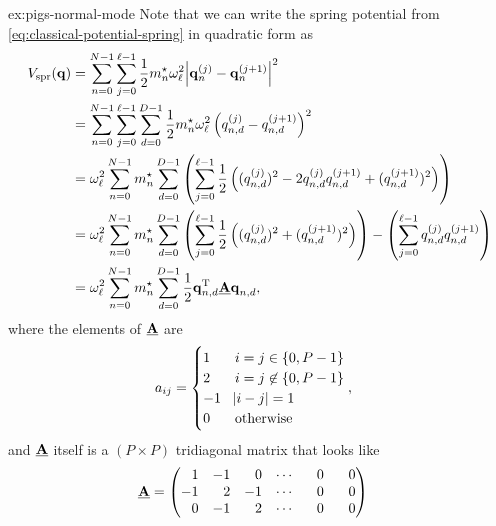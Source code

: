 \begin{DefAnswer}{ex:pigs-normal-mode}
	Note that we can write the spring potential from \cref{eq:classical-potential-spring} in quadratic form as
	\begin{subequations}
	\begin{align}
		V_\mathrm{spr}(\bm{\mathbf{q}})
		&= \sum_{n=0}^{N-1} \sum_{j=0}^{\ell - 1}
			\frac{1}{2} {m}^\star_n \omega_\ell^2 \abs{\bm{\mathbf{q}}_n^{(j)} - \bm{\mathbf{q}}_n^{(j+1)}}^2 \\
		&= \sum_{n=0}^{N-1} \sum_{j=0}^{\ell - 1} \sum_{d=0}^{D-1}
			\frac{1}{2} {m}^\star_n \omega_\ell^2 \left( q_{n,d}^{(j)} - q_{n,d}^{(j+1)} \right)^2 \\
		&= \omega_\ell^2 \sum_{n=0}^{N-1} {m}^\star_n \sum_{d=0}^{D-1} \left(
				\sum_{j=0}^{\ell - 1}
					\frac{1}{2} \left( (q_{n,d}^{(j)})^2 - 2 q_{n,d}^{(j)} q_{n,d}^{(j+1)} + (q_{n,d}^{(j+1)})^2 \right)
			\right) \\
		&= \omega_\ell^2 \sum_{n=0}^{N-1} {m}^\star_n \sum_{d=0}^{D-1} \left(
				\sum_{j=0}^{\ell - 1} \frac{1}{2} \left( (q_{n,d}^{(j)})^2 + (q_{n,d}^{(j+1)})^2 \right)
			\right) - \left(
				\sum_{j=0}^{\ell - 1} q_{n,d}^{(j)} q_{n,d}^{(j+1)}
			\right) \\
		&= \omega_\ell^2 \sum_{n=0}^{N-1} {m}^\star_n \sum_{d=0}^{D-1} \frac{1}{2} \bm{\mathbf{q}}_{n,d}^\mathrm{T} \underline{\bm{\mathbf{A}}} \bm{\mathbf{q}}_{n,d},
			\label{eq:pigs-spring-cartesian}
	\end{align}
	\end{subequations}
	where the elements of $\underline{\bm{\mathbf{A}}}$ are
	\begin{align}
		a_{ij}
		&= \begin{cases}
				1 & i = j \in \{ 0, P-1 \} \\
				2 & i = j \not\in \{ 0, P-1 \} \\
				-1 & \abs{i - j} = 1 \\
				0 & \text{otherwise}
			\end{cases},
				\label{eq:nm-matrix}
	\end{align}
	and $\underline{\bm{\mathbf{A}}}$ itself is a $(P \times P)$ tridiagonal matrix that looks like
	\begin{align}
		\underline{\bm{\mathbf{A}}}
		&= \begin{pmatrix}
				\phantom{-}1 & -1 & \phantom{-}0 & \cdots & \phantom{-}0 & \phantom{-}0 \\
				-1 & \phantom{-}2 & -1 & \cdots & \phantom{-}0 & \phantom{-}0 \\
				\phantom{-}0 & -1 & \phantom{-}2 & \cdots & \phantom{-}0 & \phantom{-}0 \\

\end{pmatrix}
\end{align}
\end{DefAnswer}
